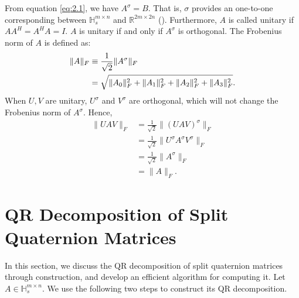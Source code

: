 \documentclass{book}
\makeatletter
\def\my@tag@font{\normalsize}
\let\amsmath@eqref\eqref
\renewcommand\eqref[1]{{\let\my@tag@font\relax\amsmath@eqref{#1}}}
\theoremstyle{remark}
\makeatother
\begin{document}
\begin{multicols}{2}
From equation \eqref{eq:2.1}, we have ${A}^\sigma = B$. 
That is, $\sigma$ provides an one-to-one corresponding between $\mathbb{H}_s^{m\times n}$ and $\mathbb{R}^{2m \times 2n}$ (\cite{Gang2024}). Furthermore, $A$ is called unitary if $AA^H = A^H A = I$. $A$ is unitary if and only if $A^\sigma$ is orthogonal.
 The Frobenius norm of $A$ is defined as: 
 \begin{align*}
     \| A \|_F &\equiv \frac{1}{\sqrt{2}} \| A^\sigma \|_F \notag \\
     &= \sqrt{\| A_0 \|_F^2 + \| A_1 \|_F^2 + \| A_2 \|_F^2 + \| A_3 \|_F^2}.
\end{align*}
When $U, V$ are unitary, $U^\sigma$ and $V^\sigma$ are orthogonal, which will not change the Frobenius norm of $A^\sigma$. Hence,
\begin{align*}
\|UAV\|_F &= \frac{1}{\sqrt{2}} \|(UAV)^\sigma\|_F \\
&= \frac{1}{\sqrt{2}} \|U^\sigma A^\sigma V^\sigma\|_F \\
&= \frac{1}{\sqrt{2}} \|A^\sigma\|_F \\
&= \|A\|_F.
\end{align*}

\section{QR Decomposition of Split Quaternion Matrices}
In this section, we discuss the QR decomposition of split quaternion matrices through construction, and develop an efficient algorithm for computing it. Let $A \in \mathbb{H}_s^{m \times n}$. We use the following two steps to construct its QR decomposition.  


\end{multicols}
\end{document}
